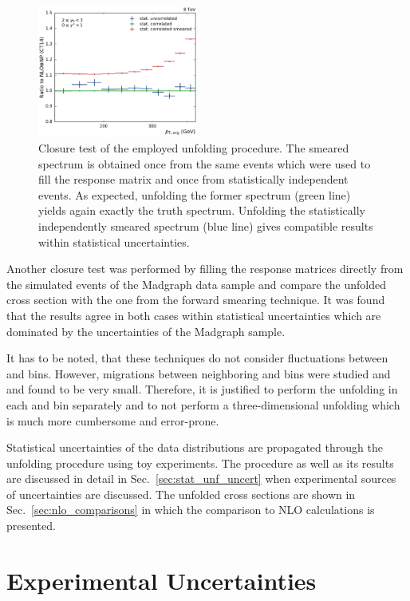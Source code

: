 \begin{figure}[htp]
    \includegraphics[width=0.47\textwidth]{figures/measurement/unf_nlo_check_yb2ys0.pdf}
    \caption[Closure check of unfolding technique]{Closure test of the employed unfolding
    procedure. The smeared spectrum is obtained once from the same events which
were used to fill the response matrix and once from statistically independent
events. As expected, unfolding the former spectrum (green line) yields again exactly the
truth spectrum. Unfolding the statistically independently smeared spectrum
(blue line) gives compatible results within statistical uncertainties.}
    \label{fig:unf_closure_test}
\end{figure}

Another closure test was performed by filling the response matrices directly
from the simulated events of the Madgraph data sample and compare the unfolded
cross section with the one from the forward smearing technique. It was found
that the results agree in both cases within statistical uncertainties which are
dominated by the uncertainties of the Madgraph sample.

It has to be noted, that these
techniques do not consider fluctuations between \ystar and \yboost bins.
However, migrations between neighboring \ystar and \yboost bins were studied
and and found to be very small. Therefore, it is justified to perform the
unfolding in each \ystar and \yboost bin separately and to not perform a
three-dimensional unfolding which is much more cumbersome and error-prone.

Statistical uncertainties of the data distributions are propagated through the
unfolding procedure using toy experiments. The procedure as well as its results
are discussed in detail in Sec.~\ref{sec:stat_unf_uncert} when experimental
sources of uncertainties are discussed. The unfolded cross sections are shown in
Sec.~\ref{sec:nlo_comparisons} in which the comparison to NLO calculations is
presented.

\section{Experimental Uncertainties}
\label{sec:experimental_uncertainties}

